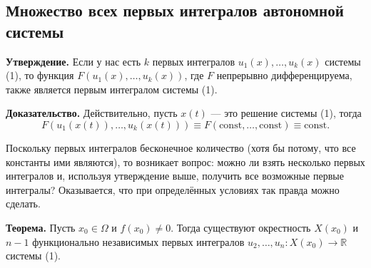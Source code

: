 
\subsection{Множество всех первых интегралов автономной системы}
\textbf{Утверждение.} Если у нас есть $k$ первых интегралов $u_1(x), \dots, u_k(x)$ системы (1), то функция $F(u_1(x), \dots, u_k(x))$, где $F$ непрерывно дифференцируема, также является первым интегралом системы (1).

\textbf{Доказательство.} Действительно, пусть $x(t)$ --- это решение системы (1), тогда
\[
    F(u_1(x(t)), \dots, u_k(x(t))) \equiv F(\text{const}, \dots, \text{const}) \equiv \text{const}.
\]

\QED

Поскольку первых интегралов бесконечное количество (хотя бы потому, что все константы ими являются), то возникает вопрос: можно ли взять несколько первых интегралов и, используя утверждение выше, получить все возможные первые интегралы? Оказывается, что при определённых условиях так правда можно сделать.

\textbf{Теорема.} Пусть $x_0 \in \Omega$ и $f(x_0) \ne 0$. Тогда существуют окрестность $X(x_0)$ и $n-1$ функционально независимых первых интегралов $u_2, \dots, u_{n}\colon X(x_0) \to \mathbb{R}$ системы (1).

